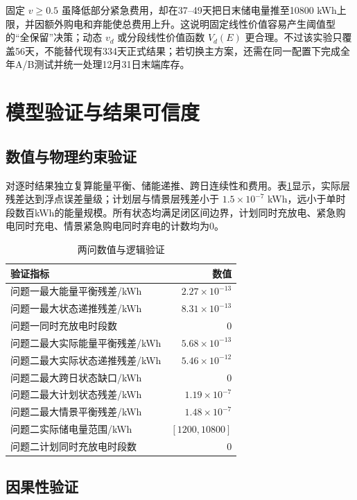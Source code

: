 \documentclass[UTF8,12pt,a4paper]{ctexart}
\begin{document}
固定 $v\ge0.5$ 虽降低部分紧急费用，却在37--49天把日末储电量推至10800 kWh上限，并因额外购电和弃能使总费用上升。这说明固定线性价值容易产生阈值型的“全保留”决策；动态 $v_d$ 或分段线性价值函数 $V_d(E)$ 更合理。不过该实验只覆盖56天，不能替代现有334天正式结果；若切换主方案，还需在同一配置下完成全年A/B测试并统一处理12月31日末端库存。

\section{模型验证与结果可信度}

\subsection{数值与物理约束验证}

对逐时结果独立复算能量平衡、储能递推、跨日连续性和费用。表\ref{tab:validation}显示，实际层残差达到浮点误差量级；计划层与情景层残差小于 $1.5\times10^{-7}$ kWh，远小于单时段数百kWh的能量规模。所有状态均满足闭区间边界，计划同时充放电、紧急购电同时充电、情景紧急购电同时弃电的计数均为0。

\begin{table}[H]
\centering
\caption{两问数值与逻辑验证}
\label{tab:validation}
\begin{tabular}{p{8.2cm}r}
\toprule
验证指标 & 数值\\
\midrule
问题一最大能量平衡残差/kWh & $2.27\times10^{-13}$\\
问题一最大状态递推残差/kWh & $8.31\times10^{-13}$\\
问题一同时充放电时段数 & 0\\
问题二最大实际能量平衡残差/kWh & $5.68\times10^{-13}$\\
问题二最大实际状态递推残差/kWh & $5.46\times10^{-12}$\\
问题二最大跨日状态缺口/kWh & 0\\
问题二最大计划状态残差/kWh & $1.19\times10^{-7}$\\
问题二最大情景平衡残差/kWh & $1.48\times10^{-7}$\\
问题二实际储电量范围/kWh & $[1200,10800]$\\
问题二计划同时充放电时段数 & 0\\
\bottomrule
\end{tabular}
\end{table}

\subsection{因果性验证}
\end{document}

